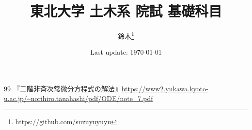 \documentclass[10pt, a4paper]{ltjsarticle}
\title{東北大学 土木系 院試 基礎科目}
\author{鈴木\thanks{https://github.com/suzuyuyuyu}}
\date{%
  Last update: \today
}
\begin{document}
\pagestyle{empty}
\maketitle
\tableofcontents






























\newpage





\newpage
\begin{thebibliography}{99}
  『二階非斉次常微分方程式の解法』\url{https://www2.yukawa.kyoto-u.ac.jp/~norihiro.tanahashi/pdf/ODE/note_7.pdf}
\end{thebibliography}
\end{document}
